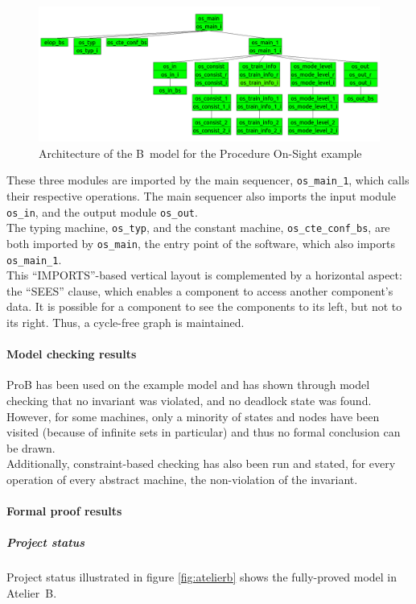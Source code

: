 \begin{figure}[h!]
\centering
\includegraphics[width=1\textwidth]{figures/procedureos}
\caption{Architecture of the B~model for the Procedure On-Sight example}
\label{fig:procos}
\end{figure}

These three modules are imported by the main sequencer, \verb+os_main_1+, which calls their respective operations. The main sequencer also imports the input module \verb+os_in+, and the output module \verb+os_out+.\\
The typing machine, \verb+os_typ+, and the constant machine, \verb+os_cte_conf_bs+, are both imported by \verb+os_main+, the entry point of the software, which also imports \verb+os_main_1+.\\
 
This ``IMPORTS''-based vertical layout is complemented by a horizontal aspect: the ``SEES'' clause, which enables a component to access another component's data. It is possible for a component to see the components to its left, but not to its right. Thus, a cycle-free graph is maintained.
 
\paragraph{Model checking results}
\label{subapp:mc}
ProB has been used on the example model and has shown through model checking that no invariant was violated, and no deadlock state was found. However, for some machines, only a minority of states and nodes have been visited (because of infinite sets in particular) and thus no formal conclusion can be drawn.\\
Additionally, constraint-based checking has also been run and stated, for every operation of every abstract machine, the non-violation of the invariant.

\paragraph{Formal proof results}
\label{subapp:proof}
\subparagraph{Project status}
Project status illustrated in figure \ref{fig:atelierb} shows the fully-proved model in Atelier~B. 

